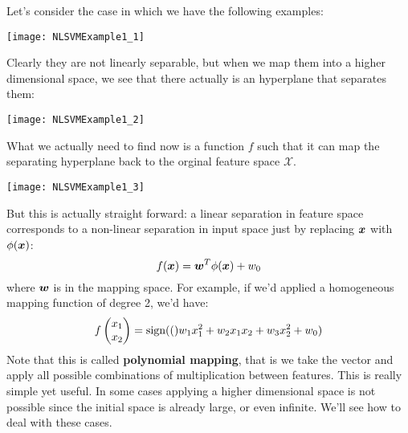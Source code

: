 Let's consider the case in which we have the following examples:
\begin{center}
  \texttt{[image: NLSVMExample1\_1]}
\end{center}
Clearly they are not linearly separable, but when we map them into a higher dimensional space, we see that there actually is an hyperplane that separates them:
\begin{center}
  \texttt{[image: NLSVMExample1\_2]}
\end{center}
What we actually need to find now is a function $f$ such that it can map the separating hyperplane back to the orginal feature space $\mathcal{X}$.
\begin{center}
  \texttt{[image: NLSVMExample1\_3]}
\end{center}
But this is actually straight forward: a linear separation in feature space corresponds to a non-linear separation in input space just by replacing $\bm{x}$ with $\phi(\bm{x})$:
\[f(\bm{x})=\bm{w}^T\phi(\bm{x})+w_0\]
where $\bm{w}$ is in the mapping space. \newline
For example, if we'd applied a homogeneous mapping function of degree 2, we'd have:
\[f
\begin{pmatrix}
  x_1\\
  x_2
\end{pmatrix}=
\text{sign}(()w_1x_1^2+w_2x_1x_2+w_3x_2^2+w_0)
\]
Note that this is called \textbf{polynomial mapping}, that is we take the vector and apply all possible combinations of multiplication between features. This is really simple yet useful. \newline
In some cases applying a higher dimensional space is not possible since the initial space is already large, or even infinite. We'll see how to deal with these cases. 
%
%
